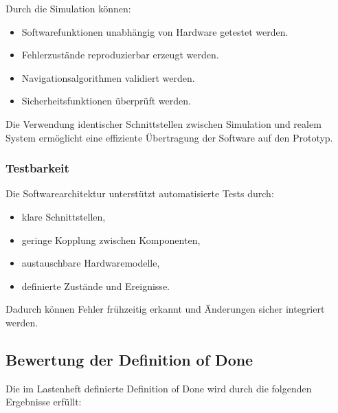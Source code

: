 \documentclass[
  a4paper,
  12pt,
  DIV=12,        %
  parskip=half,  %
  headings=small %
]{scrartcl}
\theoremstyle{definition}
\providecommand{\tightlist}{%
  \setlength{\itemsep}{0pt}\setlength{\parskip}{0pt}}
\theoremstyle{definition}
\begin{document}
Durch die Simulation können:

\begin{itemize}
\tightlist
\item
  Softwarefunktionen unabhängig von Hardware getestet werden.
\item
  Fehlerzustände reproduzierbar erzeugt werden.
\item
  Navigationsalgorithmen validiert werden.
\item
  Sicherheitsfunktionen überprüft werden.
\end{itemize}

Die Verwendung identischer Schnittstellen zwischen Simulation und realem
System ermöglicht eine effiziente Übertragung der Software auf den
Prototyp.

\subsubsection{Testbarkeit}\label{testbarkeit}

Die Softwarearchitektur unterstützt automatisierte Tests durch:

\begin{itemize}
\tightlist
\item
  klare Schnittstellen,
\item
  geringe Kopplung zwischen Komponenten,
\item
  austauschbare Hardwaremodelle,
\item
  definierte Zustände und Ereignisse.
\end{itemize}

Dadurch können Fehler frühzeitig erkannt und Änderungen sicher
integriert werden.

\subsection{Bewertung der Definition of
Done}\label{bewertung-der-definition-of-done}

Die im Lastenheft definierte Definition of Done wird durch die folgenden
Ergebnisse erfüllt:
\end{document}

